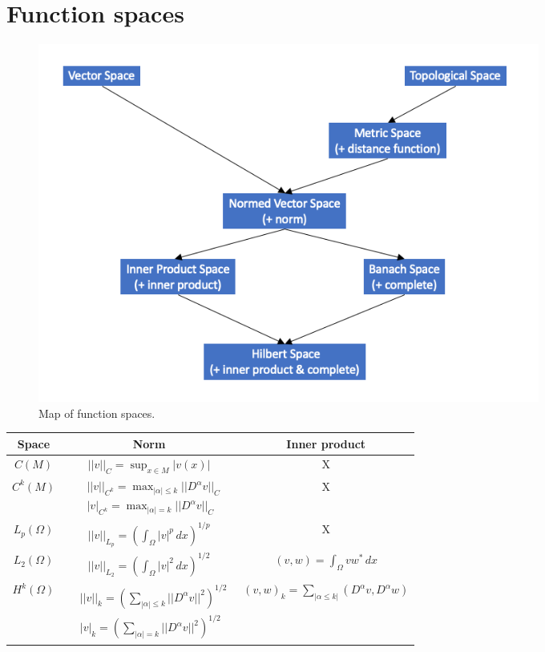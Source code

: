 \documentclass[oneside,a4paper,11pt]{report}
\begin{document}
\section{Function spaces}
\begin{figure}[ht]
   \centering
   \includegraphics[width=0.8\textwidth]{../../images/function_spaces.png}
   \caption{Map of function spaces.}
   \label{fig:function_spaces}
\end{figure}

\begin{center}
\tabulinesep=1.2mm
\begin{tabu}{c|c|c}
Space & Norm & Inner product \\
\hline
$C(M)$ & $ \displaystyle ||v||_C = \sup_{x \in M} |v(x)| $ & X \\
\hline
$C^k(M)$ & $\begin{aligned} &||v||_{C^k} = \max_{|\alpha| \le k} ||D^\alpha v||_C \\ &|v|_{C^k}=\max_{|\alpha| = k} ||D^\alpha v||_C \end{aligned}$ & X \\
\hline
$L_p(\Omega)$ & $ \displaystyle ||v||_{L_p} = \left ( \int_\Omega |v|^p \, dx \right)^{1/p} $ & X \\
\hline
$L_2(\Omega)$ & $ \displaystyle ||v||_{L_2} = \left ( \int_\Omega |v|^2 \, dx \right)^{1/2} $ & $ \displaystyle (v,w) = \int_\Omega vw^* \, dx $ \\
\hline
$H^k(\Omega)$ & $ \begin{aligned} &||v||_k = \left ( \sum_{|\alpha| \le k} ||D^\alpha v||^2 \right )^{1/2} \\ &|v|_k = \left ( \sum_{|\alpha| = k} ||D^\alpha v||^2 \right )^{1/2} \end{aligned}$ & $ \displaystyle (v,w)_k = \sum_{|\alpha \le k|} (D^\alpha v, D^\alpha w) $
\end{tabu}	
\end{center}
\end{document}
